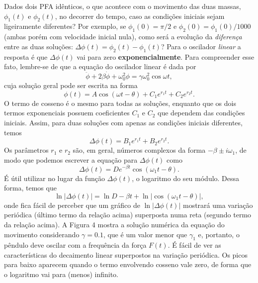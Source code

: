 \documentclass{article}
\begin{document}
Dados dois PFA idênticos, o que acontece com o movimento das duas massas, $\phi_1(t)$ e $\phi_2(t)$, no decorrer do tempo, caso as condições iniciais sejam ligeiramente diferentes? Por exemplo, se $\phi_1 (0) = \pi/2$ e $\phi_2 (0) = \phi_1 (0)/1000$ (ambas porém com velocidade inicial nula), como será a evolução da \textit{diferença} entre as duas soluções: $\Delta \phi(t) = \phi_2 (t) - \phi_1 (t)$? Para o oscilador \textit{linear} a resposta é que $\Delta\phi(t)$ vai para zero \textbf{exponencialmente}. Para compreender esse fato, lembre-se de que a equação do oscilador linear é dada por
\begin{equation}
    \ddot{\phi} + 2\beta\dot{\phi} + \omega_{0}^{2}\phi = \gamma\omega_{0}^{2}\cos\omega t,
\end{equation}
cuja solução geral pode ser escrita na forma
\begin{equation}
    \phi(t) = A\cos(\omega t - \theta) + C_1 e^{r_1 t} + C_2 e^{r_2 t}.
\end{equation}
O termo de cosseno é o mesmo para todas as soluções, enquanto que os dois termos exponenciais possuem coeficientes $C_1$ e $C_2$ que dependem das condições iniciais. Assim, para duas soluções com apenas as condições iniciais diferentes, temos
\begin{equation}
    \Delta\phi(t) = B_1 e^{r_1 t} + B_2 e^{r_2 t}.
\end{equation}
Os parâmetros $r_1$ e $r_2$ são, em geral, números complexos da forma $-\beta \pm i\omega_1$, de modo que podemos escrever a equação para $\Delta\phi(t)$ como
\begin{equation}
    \Delta\phi(t) = D e^{-\beta t}\cos(\omega_1 t - \theta).
\end{equation}
É útil utilizar no lugar da função $\Delta\phi(t)$, o logaritmo do seu módulo. Dessa forma, temos que
\begin{equation}
    \ln{|\Delta\phi(t)|} = \ln D - \beta t + \ln{|\cos(\omega_1 t - \theta)|},
\end{equation}
onde fica fácil de perceber que um gráfico de $\ln{|\Delta\phi(t)|}$ mostrará uma variação periódica (último termo da relação acima) superposta numa reta (segundo termo da relação acima). A Figura 4 mostra a solução numérica da equação do movimento considerando $\gamma = 0.1$, que é um valor menor que $\gamma_1$ e, portanto, o pêndulo deve oscilar com a frequência da força $F(t)$. É fácil de ver as características do decaimento linear superpostos na variação periódica. Os picos para baixo aparecem quando o termo envolvendo cosseno vale zero, de forma que o logaritmo vai para (menos) infinito.
\end{document}
